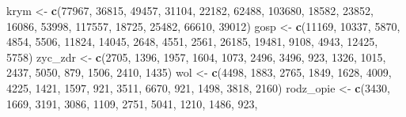 \documentclass[polish,]{book}
\newenvironment{Shaded}{\begin{snugshade}}{\end{snugshade}}
\newcommand{\DecValTok}[1]{\textcolor[rgb]{0.00,0.00,0.81}{#1}}
\newcommand{\KeywordTok}[1]{\textcolor[rgb]{0.13,0.29,0.53}{\textbf{#1}}}
\newcommand{\NormalTok}[1]{#1}
\newcommand{\StringTok}[1]{\textcolor[rgb]{0.31,0.60,0.02}{#1}}
\begin{document}
\begin{Shaded}
\begin{Highlighting}[]
\NormalTok{krym <-}\StringTok{ }\KeywordTok{c}\NormalTok{(}\DecValTok{77967}\NormalTok{, }\DecValTok{36815}\NormalTok{, }\DecValTok{49457}\NormalTok{, }\DecValTok{31104}\NormalTok{, }\DecValTok{22182}\NormalTok{, }\DecValTok{62488}\NormalTok{, }\DecValTok{103680}\NormalTok{, }\DecValTok{18582}\NormalTok{, }\DecValTok{23852}\NormalTok{, }\DecValTok{16086}\NormalTok{,}
          \DecValTok{53998}\NormalTok{, }\DecValTok{117557}\NormalTok{, }\DecValTok{18725}\NormalTok{, }\DecValTok{25482}\NormalTok{, }\DecValTok{66610}\NormalTok{, }\DecValTok{39012}\NormalTok{)}
\NormalTok{gosp <-}\StringTok{ }\KeywordTok{c}\NormalTok{(}\DecValTok{11169}\NormalTok{, }\DecValTok{10337}\NormalTok{, }\DecValTok{5870}\NormalTok{, }\DecValTok{4854}\NormalTok{, }\DecValTok{5506}\NormalTok{, }\DecValTok{11824}\NormalTok{, }\DecValTok{14045}\NormalTok{, }\DecValTok{2648}\NormalTok{, }\DecValTok{4551}\NormalTok{, }\DecValTok{2561}\NormalTok{,}
          \DecValTok{26185}\NormalTok{, }\DecValTok{19481}\NormalTok{, }\DecValTok{9108}\NormalTok{, }\DecValTok{4943}\NormalTok{, }\DecValTok{12425}\NormalTok{, }\DecValTok{5758}\NormalTok{)}
\NormalTok{zyc_zdr <-}\StringTok{ }\KeywordTok{c}\NormalTok{(}\DecValTok{2705}\NormalTok{, }\DecValTok{1396}\NormalTok{, }\DecValTok{1957}\NormalTok{, }\DecValTok{1604}\NormalTok{, }\DecValTok{1073}\NormalTok{, }\DecValTok{2496}\NormalTok{, }\DecValTok{3496}\NormalTok{, }\DecValTok{923}\NormalTok{, }\DecValTok{1326}\NormalTok{, }\DecValTok{1015}\NormalTok{, }\DecValTok{2437}\NormalTok{,}
             \DecValTok{5050}\NormalTok{, }\DecValTok{879}\NormalTok{, }\DecValTok{1506}\NormalTok{, }\DecValTok{2410}\NormalTok{, }\DecValTok{1435}\NormalTok{)}
\NormalTok{wol <-}\StringTok{ }\KeywordTok{c}\NormalTok{(}\DecValTok{4498}\NormalTok{, }\DecValTok{1883}\NormalTok{, }\DecValTok{2765}\NormalTok{, }\DecValTok{1849}\NormalTok{, }\DecValTok{1628}\NormalTok{, }\DecValTok{4009}\NormalTok{, }\DecValTok{4225}\NormalTok{, }\DecValTok{1421}\NormalTok{, }\DecValTok{1597}\NormalTok{, }\DecValTok{921}\NormalTok{, }\DecValTok{3511}\NormalTok{,}
         \DecValTok{6670}\NormalTok{, }\DecValTok{921}\NormalTok{, }\DecValTok{1498}\NormalTok{, }\DecValTok{3818}\NormalTok{, }\DecValTok{2160}\NormalTok{)}
\NormalTok{rodz_opie <-}\StringTok{ }\KeywordTok{c}\NormalTok{(}\DecValTok{3430}\NormalTok{, }\DecValTok{1669}\NormalTok{, }\DecValTok{3191}\NormalTok{, }\DecValTok{3086}\NormalTok{, }\DecValTok{1109}\NormalTok{, }\DecValTok{2751}\NormalTok{, }\DecValTok{5041}\NormalTok{, }\DecValTok{1210}\NormalTok{, }\DecValTok{1486}\NormalTok{, }\DecValTok{923}\NormalTok{,}

\end{Highlighting}
\end{Shaded}
\end{document}
